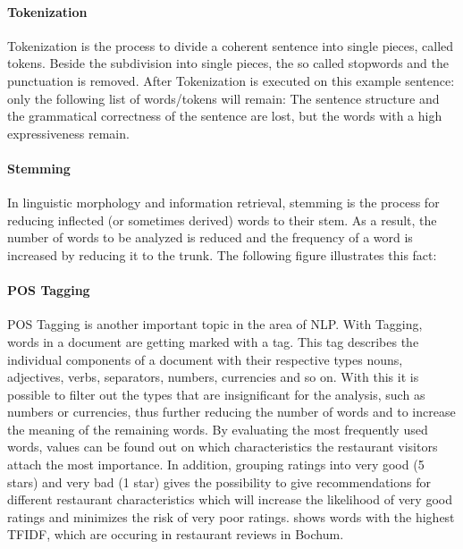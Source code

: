 \paragraph{Tokenization}
Tokenization is the process to divide a coherent sentence into single pieces, called tokens.
Beside the subdivision into single pieces, the so called stopwords and the punctuation is removed.
After Tokenization is executed on this example sentence:
\newline
{}
\newline
only the following list of words/tokens will remain:
\newline
{}
\newline
The sentence structure and the grammatical correctness of the sentence are lost, but the words with a high expressiveness remain.
\paragraph{Stemming}
In linguistic morphology and information retrieval, stemming is the process for reducing inflected (or sometimes derived) words to their stem.\cite{TextMiner14}
As a result, the number of words to be analyzed is reduced and the frequency of a word is increased by reducing it to the trunk.
The following figure illustrates this fact:
\paragraph{\acs{POS} Tagging}
\ac{POS} Tagging is another important topic in the area of \ac{NLP}.
With Tagging, words in a document are getting marked with a tag.
This tag describes the individual components of a document with their respective types \eg{} nouns, adjectives, verbs, separators, numbers, currencies and so on.
With this it is possible to filter out the types that are insignificant for the analysis, such as numbers or currencies, thus further reducing the number of words and
to increase the meaning of the remaining words.
\newline
By evaluating the most frequently used words, values can be found out on which characteristics the restaurant visitors attach the most importance.
In addition, grouping ratings into very good (5 stars) and very bad (1 star) gives the possibility to give recommendations for different restaurant characteristics which will increase the likelihood of very good ratings
and minimizes the risk of very poor ratings.
 shows words with the highest \ac{TFIDF}, which are occuring in restaurant reviews in Bochum.
